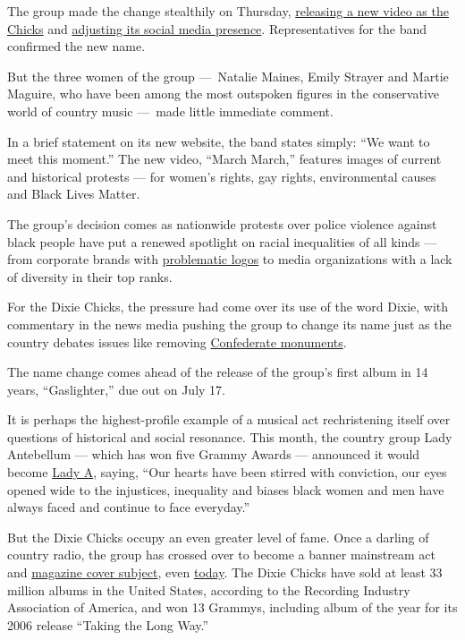 The group made the change stealthily on Thursday,
\href{https://youtu.be/xwBjF_VVFvE}{releasing a new video as the Chicks}
and \href{https://twitter.com/thechicks}{adjusting its social media
presence}. Representatives for the band confirmed the new name.

But the three women of the group ---~Natalie Maines, Emily Strayer and
Martie Maguire, who have been among the most outspoken figures in the
conservative world of country music ---~made little immediate comment.

In a brief statement on its new website, the band states simply: ``We
want to meet this moment.'' The new video, ``March March,'' features
images of current and historical protests --- for women's rights, gay
rights, environmental causes and Black Lives Matter.

The group's decision comes as nationwide protests over police violence
against black people have put a renewed spotlight on racial inequalities
of all kinds --- from corporate brands with
\href{https://www.nytimes3xbfgragh.onion/2020/06/17/business/aunt-jemima-racial-stereotype.html}{problematic
logos} to media organizations with a lack of diversity in their top
ranks.

For the Dixie Chicks, the pressure had come over its use of the word
Dixie, with commentary in the news media pushing the group to change its
name just as the country debates issues like removing
\href{https://www.nytimes3xbfgragh.onion/2020/06/03/us/confederate-statues-george-floyd.html}{Confederate
monuments}.

The name change comes ahead of the release of the group's first album in
14 years, ``Gaslighter,'' due out on July 17.

It is perhaps the highest-profile example of a musical act rechristening
itself over questions of historical and social resonance. This month,
the country group Lady Antebellum --- which has won five Grammy Awards
--- announced it would become
\href{https://www.nytimes3xbfgragh.onion/2020/06/11/arts/music/lady-antebellum-name-change-lady-a.html}{Lady
A}, saying, ``Our hearts have been stirred with conviction, our eyes
opened wide to the injustices, inequality and biases black women and men
have always faced and continue to face everyday.''

But the Dixie Chicks occupy an even greater level of fame. Once a
darling of country radio, the group has crossed over to become a banner
mainstream act and
\href{https://ew.com/article/2013/08/09/dixie-chicks-nude-ew-cover-court-yard-hounds/}{magazine
cover subject}, even
\href{https://www.allure.com/story/dixie-chicks-april-2020-cover-interview}{today}.
The Dixie Chicks have sold at least 33 million albums in the United
States, according to the Recording Industry Association of America, and
won 13 Grammys, including album of the year for its 2006 release
``Taking the Long Way.''

